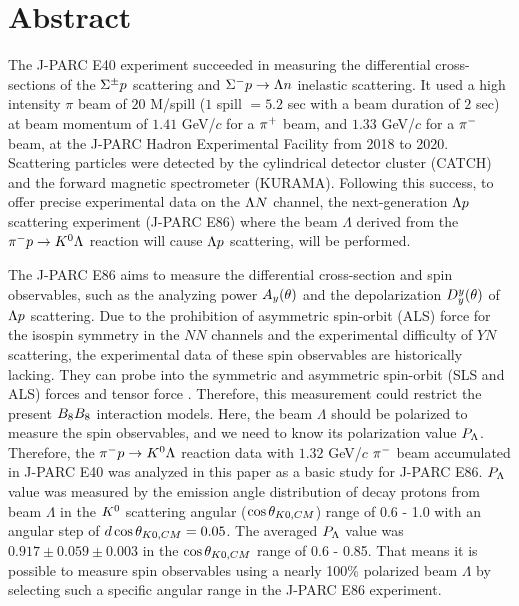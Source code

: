 %

\chapter{Abstract}
The J-PARC E40 experiment succeeded in measuring the differential cross-sections of the $\Sigma^{\pm}p$ scattering and $\Sigma^- p \to \Lambda n$ inelastic scattering. It used a high intensity $\pi$ beam of $20$ M/spill ($1$ spill $= 5.2$ sec with a beam duration of $2$ sec) at beam momentum of $1.41$ GeV/$c$ for a $\pi^{+}$ beam, and $1.33$ GeV/$c$ for a $\pi^{-}$ beam, at the J-PARC Hadron Experimental Facility from 2018 to 2020. Scattering particles were detected by the cylindrical detector cluster (CATCH) and the forward magnetic spectrometer (KURAMA). Following this success, to offer precise experimental data on the $\Lambda N$ channel, the next-generation $\Lambda p$ scattering experiment (J-PARC E86) where the beam $\Lambda$ derived from the $\pi^- p \to K^0 \Lambda$ reaction will cause $\Lambda p$ scattering, will be performed. 

The J-PARC E86 aims to measure the differential cross-section and spin observables, such as the analyzing power $A_{y}(\theta)$ and the depolarization $D^{y}_{y}(\theta)$ of $\Lambda p$ scattering. Due to the prohibition of asymmetric spin-orbit (ALS) force for the isospin symmetry in the $NN$ channels and the experimental difficulty of $YN$ scattering, the experimental data of these spin observables are historically lacking. They can probe into the symmetric and asymmetric spin-orbit (SLS and ALS) forces and tensor force \cite{Ishikawa-2004}. Therefore, this measurement could restrict the present $B_{8}B_{8}$ interaction models. Here, the beam $\Lambda$ should be polarized to measure the spin observables, and we need to know its polarization value $P_{\Lambda}$. Therefore, the $\pi^- p \to K^0 \Lambda$ reaction data with $1.32$ GeV/$c$ $\pi^{-}$ beam accumulated in J-PARC E40 was analyzed in this paper as a basic study for J-PARC E86. $P_{\Lambda}$ value was measured by the emission angle distribution of decay protons from beam $\Lambda$ in the $K^{0}$ scattering angular ($\cos{\theta_{K0,CM}}$) range of 0.6 - 1.0 with an angular step of $d\cos{\theta_{K0,CM}}=0.05$. The averaged $P_{\Lambda}$ value was $0.917\pm0.059\pm0.003$ in the $\cos{\theta_{K0,CM}}$ range of 0.6 - 0.85. That means it is possible to measure spin observables using a nearly 100\% polarized beam $\Lambda$ by selecting such a specific angular range in the J-PARC E86 experiment. 

